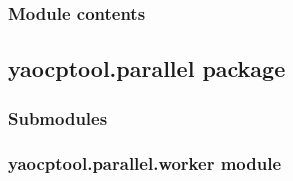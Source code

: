 \documentclass[letterpaper,10pt,english]{sphinxmanual}
\begin{document}
\subsubsection{Module contents}
\label{\detokenize{yaocptool.optimization:module-yaocptool.optimization}}\label{\detokenize{yaocptool.optimization:module-contents}}

\subsection{yaocptool.parallel package}
\label{\detokenize{yaocptool.parallel:yaocptool-parallel-package}}\label{\detokenize{yaocptool.parallel::doc}}

\subsubsection{Submodules}
\label{\detokenize{yaocptool.parallel:submodules}}

\subsubsection{yaocptool.parallel.worker module}
\label{\detokenize{yaocptool.parallel:module-yaocptool.parallel.worker}}\label{\detokenize{yaocptool.parallel:yaocptool-parallel-worker-module}}
\end{document}
